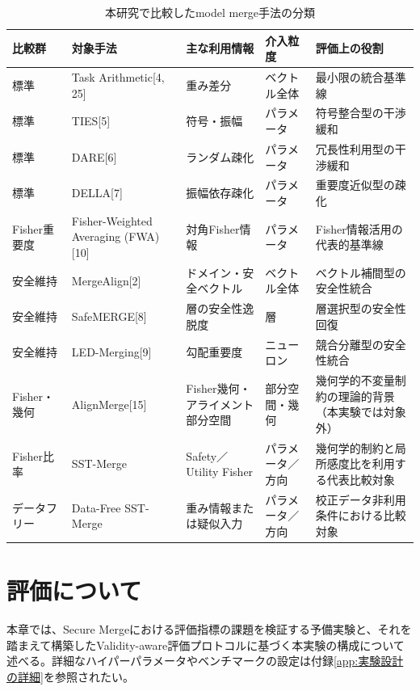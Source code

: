 \documentclass{article}
\begin{document}
\begin{table}[t]
\centering
\caption{本研究で比較したmodel merge手法の分類}
\label{tab:baseline_methods}
\small
\begin{tabular}{p{1.8cm}p{2.6cm}p{2.8cm}p{2.3cm}p{4.3cm}}
\toprule
比較群 & 対象手法 & 主な利用情報 & 介入粒度 & 評価上の役割 \\
\midrule
標準 & Task Arithmetic[4, 25] & 重み差分 & ベクトル全体 & 最小限の統合基準線 \\
標準 & TIES[5] & 符号・振幅 & パラメータ & 符号整合型の干渉緩和 \\
標準 & DARE[6] & ランダム疎化 & パラメータ & 冗長性利用型の干渉緩和 \\
標準 & DELLA[7] & 振幅依存疎化 & パラメータ & 重要度近似型の疎化 \\
Fisher重要度 & Fisher-Weighted Averaging (FWA)[10] & 対角Fisher情報 & パラメータ & Fisher情報活用の代表的基準線 \\
安全維持 & MergeAlign[2] & ドメイン・安全ベクトル & ベクトル全体 & ベクトル補間型の安全性統合 \\
安全維持 & SafeMERGE[8] & 層の安全性逸脱度 & 層 & 層選択型の安全性回復 \\
安全維持 & LED-Merging[9] & 勾配重要度 & ニューロン & 競合分離型の安全性統合 \\
Fisher・幾何 & AlignMerge[15] & Fisher幾何・アライメント部分空間 & 部分空間・幾何 & 幾何学的不変量制約の理論的背景（本実験では対象外） \\
Fisher比率 & SST-Merge & Safety／Utility Fisher & パラメータ／方向 & 幾何学的制約と局所感度比を利用する代表比較対象 \\
データフリー & Data-Free SST-Merge & 重み情報または疑似入力 & パラメータ／方向 & 校正データ非利用条件における比較対象 \\
\bottomrule
\end{tabular}
\end{table}

\section{評価について}
本章では、Secure Mergeにおける評価指標の課題を検証する予備実験と、それを踏まえて構築したValidity-aware評価プロトコルに基づく本実験の構成について述べる。詳細なハイパーパラメータやベンチマークの設定は付録\ref{app:実験設計の詳細}を参照されたい。
\end{document}
